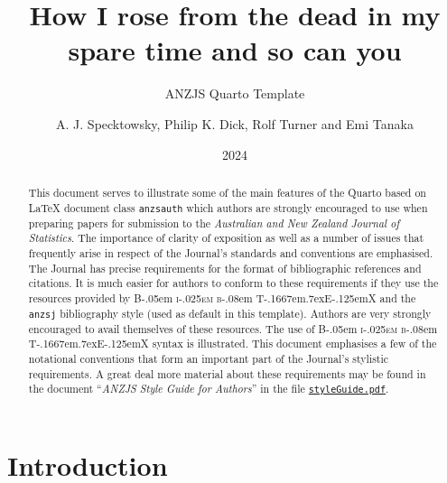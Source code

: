 \documentclass[
doublespace,
  times]{anzsauth}
\title{How I rose from the dead in my spare time and so can you}
\subtitle{ANZJS Quarto Template}
\author{
A. J. Specktowsky\addressnum{1},
Philip K. Dick\addressnum{2},
Rolf Turner\addressnum{3} and 
Emi Tanaka
\addressnum{4}\corrauth
}
\affiliation{
School of Hard Knocks, 
School of Design Terrace, 
University of Auckland and 
The Australian National University
}
\date{2024}
\newcommand\BibTeX{{\rmfamily B\kern-.05em \textsc{i\kern-.025em b}\kern-.08em
T\kern-.1667em\lower.7ex\hbox{E}\kern-.125emX}}
\begin{document}
\begin{abstract}
This document serves to illustrate some of the main features of the
Quarto based on \LaTeX{} document class \texttt{anzsauth} which authors
are strongly encouraged to use when preparing papers for submission to
the \emph{Australian and New Zealand Journal of Statistics}. The
importance of clarity of exposition as well as a number of issues that
frequently arise in respect of the Journal's standards and conventions
are emphasised. The Journal has precise requirements for the format of
bibliographic references and citations. It is much easier for authors to
conform to these requirements if they use the resources provided by
\BibTeX{} and the \texttt{anzsj} bibliography style (used as default in
this template). Authors are very strongly encouraged to avail themselves
of these resources. The use of \BibTeX{} syntax is illustrated. This
document emphasises a few of the notational conventions that form an
important part of the Journal's stylistic requirements. A great deal
more material about these requirements may be found in the document
``\emph{ANZJS Style Guide for Authors}'' in the file
\href{https://github.com/emitanaka/quarto-anzjs/blob/master/styleGuide.pdf}{\texttt{styleGuide.pdf}}.
\end{abstract}

          

\maketitle

\section{Introduction}\label{sec-intro}
\end{document}
